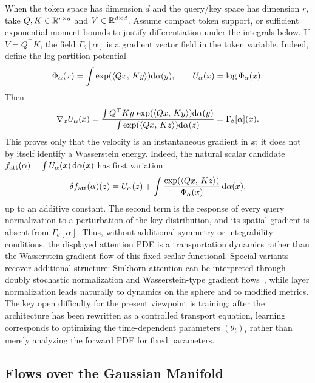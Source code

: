 When the token space has dimension $d$ and the query/key space has dimension $r$, take $Q,K\in\mathbb{R}^{r\times d}$ and $V\in\mathbb{R}^{d\times d}$. Assume compact token support, or sufficient exponential-moment bounds to justify differentiation under the integrals below. If $V=Q^\top K$, the field $\Gamma_\theta[\alpha]$ is a gradient vector field in the token variable. Indeed, define the log-partition potential
\[
	\Phi_\alpha(x)
	=
	\int \exp(\langle Qx,\,Ky\rangle)\mathrm{d}\alpha(y),
	\qquad
	U_\alpha(x)=\log\Phi_\alpha(x).
\]
Then
\[
	\nabla_x U_\alpha(x)
	=
	\frac{\int Q^\top K y\,\exp(\langle Qx,\,Ky\rangle)\mathrm{d}\alpha(y)}
	     {\int \exp(\langle Qx,\,Kz\rangle)\mathrm{d}\alpha(z)}
	=
	\Gamma_\theta[\alpha](x).
\]
This proves only that the velocity is an instantaneous gradient in $x$; it does not by itself identify a Wasserstein energy. Indeed, the natural scalar candidate $f_{\rm att}(\alpha)=\int U_\alpha(x)\,\mathrm{d}\alpha(x)$ has first variation
\[
	\delta f_{\rm att}(\alpha)(z)
	=
	U_\alpha(z)
	+
	\int
	\frac{\exp(\langle Qx,\,Kz\rangle)}{\Phi_\alpha(x)}
	\,\mathrm{d}\alpha(x),
\]
up to an additive constant. The second term is the response of every query normalization to a perturbation of the key distribution, and its spatial gradient is absent from $\Gamma_\theta[\alpha]$. Thus, without additional symmetry or integrability conditions, the displayed attention PDE is a transportation dynamics rather than the Wasserstein gradient flow of this fixed scalar functional. Special variants recover additional structure: Sinkhorn attention can be interpreted through doubly stochastic normalization and Wasserstein-type gradient flows~\citep{Sander2022Sinkformers,Castin2025DynamicsTransformers}, while layer normalization leads naturally to dynamics on the sphere and to modified metrics. The key open difficulty for the present viewpoint is training: after the architecture has been rewritten as a controlled transport equation, learning corresponds to optimizing the time-dependent parameters $(\theta_t)_t$ rather than merely analyzing the forward PDE for fixed parameters.

\subsection{Flows over the Gaussian Manifold}
\label{sec-gaussian-closure-transport-dynamics}


